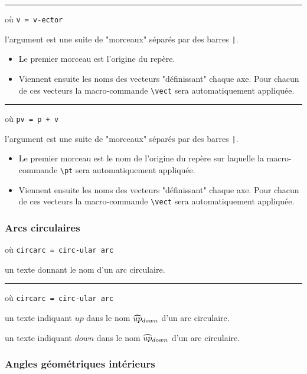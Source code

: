 \documentclass[12pt,a4paper]{article}
\newcommand\env[1]{\texttt{#1}}
\newcommand\macro[1]{\env{\textbackslash{}#1}}
\theoremstyle{definition}
\newcommand\separation{
	\medskip
	\hfill\rule{0.5\textwidth}{0.75pt}\hfill
	\medskip
}
\begin{document}
\separation

 où \quad \verb+v = v-ector+

\IDarg{} l'argument est une suite de "morceaux" séparés par des barres \verb+|+.

\begin{itemize}[topsep=0pt]
	\item Le premier morceau est l'origine du repère.

	\item Viennent ensuite les noms des vecteurs "définissant" chaque axe. Pour chacun de ces vecteurs la macro-commande \macro{vect} sera automatiquement appliquée.
\end{itemize}


\separation

 où \quad \verb&pv = p + v&

\IDarg{} l'argument est une suite de "morceaux" séparés par des barres \verb+|+.

\begin{itemize}[topsep=0pt]
	\item Le premier morceau est le nom de l'origine du repère sur laquelle la macro-commande \macro{pt} sera automatiquement appliquée.

	\item Viennent ensuite les noms des vecteurs "définissant" chaque axe. Pour chacun de ces vecteurs la macro-commande \macro{vect} sera automatiquement appliquée.
\end{itemize}
\subsubsection{Arcs circulaires}

 où \quad \verb+circarc = circ-ular arc+

\IDarg{} un texte donnant le nom d'un arc circulaire.


\separation


 où \quad \verb+circarc = circ-ular arc+

 un texte indiquant $up$ dans le nom $\circarc*{up}{down}$ d'un arc circulaire.

 un texte indiquant $down$ dans le nom $\circarc*{up}{down}$ d'un arc circulaire.
\subsubsection{Angles géométriques \og intérieurs \fg}
\end{document}
